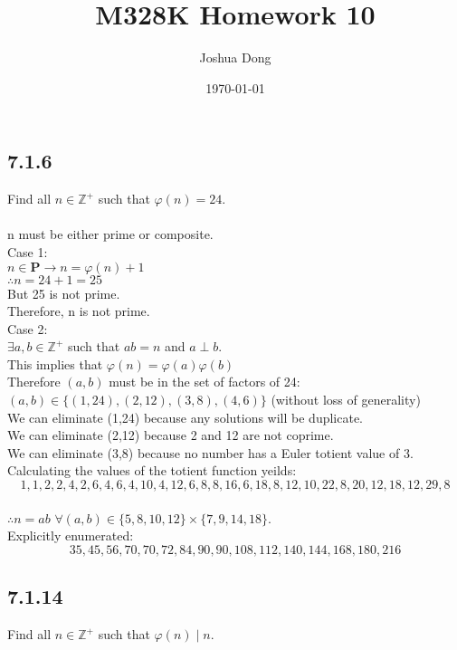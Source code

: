 \documentclass{article}
\begin{document}
\title{M328K\: Homework 10}
\author{Joshua Dong}
\date{\today}
\maketitle

\subsection{7.1.6}
Find all $n \in \mathbb{Z}^+$ such that $\varphi(n)=24$.
\\
\\n must be either prime or composite.
\\Case 1:
\\$n \in \textbf{P} \rightarrow n = \varphi(n)+1$
\\$\therefore n = 24+1 = 25$
\\But 25 is not prime.
\\Therefore, n is not prime.
\\Case 2:
\\$\exists a,b \in \mathbb{Z}^+$ such that $ab = n$ and $a \perp b$.
\\This implies that $\varphi(n) = \varphi(a)\varphi(b)$
\\Therefore $(a, b)$ must be in the set of factors of 24:
\\$(a,b) \in \{(1,24), (2,12), (3,8), (4,6)\}$ (without loss of generality)
\\We can eliminate (1,24) because any solutions will be duplicate.
\\We can eliminate (2,12) because 2 and 12 are not coprime.
\\We can eliminate (3,8) because no number has a Euler totient value of 3.
\\Calculating the values of the totient function yeilds:
\\\[1,1,2,2,4,2,6,4,6,4,10,4,12,6,8,8,16,6,18,8,12,10,22,8,20,12,18,12,29,8\]
\\$\therefore n = ab$
\;\;$\forall (a,b) \in \{5, 8, 10, 12\} \times \{7, 9, 14, 18\}$.
\\Explicitly enumerated:
\\\[35, 45, 56, 70, 70, 72, 84, 90, 90, 108, 112, 140, 144, 168, 180, 216\]

\subsection{7.1.14}
Find all $n \in \mathbb{Z}^+$ such that $\varphi(n) \mid n$.
\\
\end{document}
